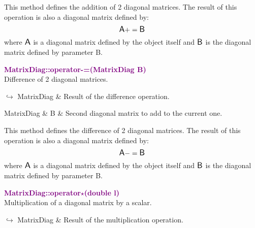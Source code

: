 This method defines the addition of 2 diagonal matrices.
The result of this operation is also a diagonal matrix defined by:
\begin{equation*}
\mbox{\large\ensuremath{\mathsf{A}}} += \mbox{\large\ensuremath{\mathsf{B}}}
\end{equation*}
where $\mbox{\large\ensuremath{\mathsf{A}}}$ is a diagonal matrix defined by the object itself and $\mbox{\large\ensuremath{\mathsf{B}}}$ is the diagonal matrix defined by parameter B.

\textcolor{purple}{\textbf{MatrixDiag::operator-=(MatrixDiag B)}}\label{MatrixDiag::operator-=(MatrixDiag B)}\\
Difference of 2 diagonal matrices.\vspace*{-0.5em}
\begin{tcolorbox}[grow to left by=-1cm, width=\textwidth-1cm,myArgs,tabularx={l|R}]
$\hookrightarrow$ MatrixDiag & Result of the difference operation.
\end{tcolorbox}

\begin{tcolorbox}[width=\textwidth,myArgs,tabularx={ll|R}]
MatrixDiag & B & Second diagonal matrix to add to the current one.
\end{tcolorbox}

This method defines the difference of 2 diagonal matrices.
The result of this operation is also a diagonal matrix defined by:
\begin{equation*}
\mbox{\large\ensuremath{\mathsf{A}}} -= \mbox{\large\ensuremath{\mathsf{B}}}
\end{equation*}
where $\mbox{\large\ensuremath{\mathsf{A}}}$ is a diagonal matrix defined by the object itself and $\mbox{\large\ensuremath{\mathsf{B}}}$ is the diagonal matrix defined by parameter B.

\textcolor{purple}{\textbf{MatrixDiag::operator$\star$(double l)}}\label{MatrixDiag::operator*(double l)}\\
Multiplication of a diagonal matrix by a scalar.\vspace*{-0.5em}
\begin{tcolorbox}[grow to left by=-1cm, width=\textwidth-1cm,myArgs,tabularx={l|R}]
$\hookrightarrow$ MatrixDiag & Result of the multiplication operation.
\end{tcolorbox}


